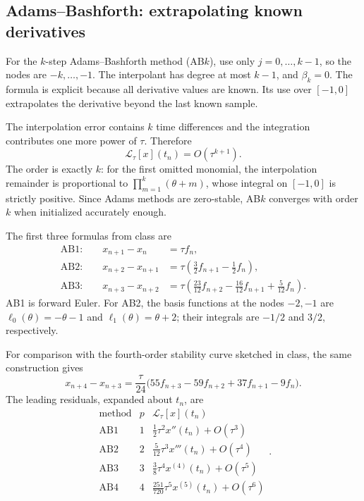\subsection{Adams--Bashforth: extrapolating known derivatives}

For the \(k\)-step Adams--Bashforth method (AB\(k\)), use only
\(j=0,\ldots,k-1\), so the nodes are \(-k,\ldots,-1\).
The interpolant has degree at most \(k-1\), and \(\beta_k=0\).
The formula is explicit because all derivative values are known.
Its use over \([-1,0]\) extrapolates the derivative beyond the last
known sample.

The interpolation error contains \(k\) time differences and the
integration contributes one more power of \(\tau\). Therefore
\[
 \mathcal L_\tau[x](t_n)=O(\tau^{k+1}).
\]
The order is exactly \(k\): for the first omitted monomial,
the interpolation remainder is proportional to
\(\prod_{m=1}^k(\theta+m)\), whose integral on \([-1,0]\)
is strictly positive. Since Adams methods are zero-stable,
AB\(k\) converges with order \(k\) when initialized accurately
enough.

The first three formulas from class are
\begin{align}
 \text{AB1:}\qquad
 x_{n+1}-x_n&=\tau f_n,
       \label{eq:ab1-oct-09}\\
 \text{AB2:}\qquad
 x_{n+2}-x_{n+1}&=\tau\left(\frac32f_{n+1}-\frac12f_n\right),
       \label{eq:ab2-oct-09}\\
 \text{AB3:}\qquad
 x_{n+3}-x_{n+2}&=\tau\left(\frac{23}{12}f_{n+2}
                  -\frac{16}{12}f_{n+1}+\frac5{12}f_n\right).
       \label{eq:ab3-oct-09}
\end{align}
AB1 is forward Euler. For AB2, the basis functions at the nodes
\(-2,-1\) are \(\ell_0(\theta)=-\theta-1\) and
\(\ell_1(\theta)=\theta+2\); their integrals are \(-1/2\)
and \(3/2\), respectively.

For comparison with the fourth-order stability curve sketched in
class, the same construction gives
\begin{equation}\label{eq:ab4-oct-09}
 x_{n+4}-x_{n+3}
   =\frac\tau{24}\bigl(55f_{n+3}-59f_{n+2}+37f_{n+1}-9f_n\bigr).
\end{equation}
The leading residuals, expanded about \(t_n\), are
\[
 \begin{array}{c|c|c}
  \text{method}&p&\mathcal L_\tau[x](t_n)\\ \hline
  \text{AB1}&1&\tfrac12\tau^2x''(t_n)+O(\tau^3)\\
  \text{AB2}&2&\tfrac5{12}\tau^3x'''(t_n)+O(\tau^4)\\
  \text{AB3}&3&\tfrac38\tau^4x^{(4)}(t_n)+O(\tau^5)\\
  \text{AB4}&4&\tfrac{251}{720}\tau^5x^{(5)}(t_n)+O(\tau^6)
 \end{array}.
\]

